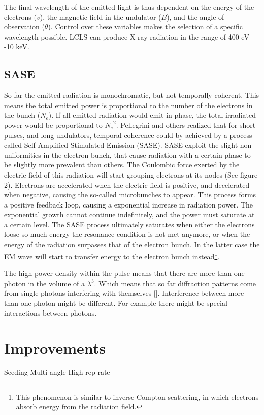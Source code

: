 The final wavelength of the emitted light is thus dependent on the energy of the electrons ($v$), the magnetic field in the undulator ($B$), and the angle of observation ($\theta$). Control over these variables makes the selection of a specific wavelength possible. LCLS can produce X-ray radiation in the range of 400 eV -10 keV. 


\subsection{SASE}
So far the emitted radiation is monochromatic, but not temporally coherent. This means the total emitted power is proportional to the number of the electrons in the bunch ($N_e$). If all emitted radiation would emit in phase, the total irradiated power would be proportional to ${N_e}^2$. Pellegrini and others realized that for short pulses, and long undulators, temporal coherence could by achieved by a process called Self Amplified Stimulated Emission (SASE). SASE exploit the slight non-uniformities in the electron bunch, that cause radiation with a certain phase to be slightly more prevalent than others. The Coulombic force exerted by the electric field of this radiation will start grouping electrons at its nodes (See figure 2). Electrons are accelerated when the electric field is positive, and decelerated when negative, causing the so-called microbunches to appear. This process forms a positive feedback loop, causing a exponential increase in radiation power. The  exponential  growth  cannot  continue  indefinitely, and  the  power  must  saturate  at  a  certain  level. The SASE process ultimately saturates when either the electrons loose so much energy the resonance condition is not met anymore, or when the energy of the radiation surpasses that of the electron bunch. In the latter case the EM wave will start to transfer energy to the electron bunch instead\footnote{This phenomenon is similar to inverse Compton scattering, in which electrons absorb energy from the radiation field.}.

The high power density within the pulse means that there are more than one photon in the volume of a $\lambda^3$. Which means that so far diffraction patterns come from single photons interfering with themselves []. Interference between more than one photon might be different. For example there might be special interactions between photons. 

\section{Improvements}

Seeding
Multi-angle
High rep rate




